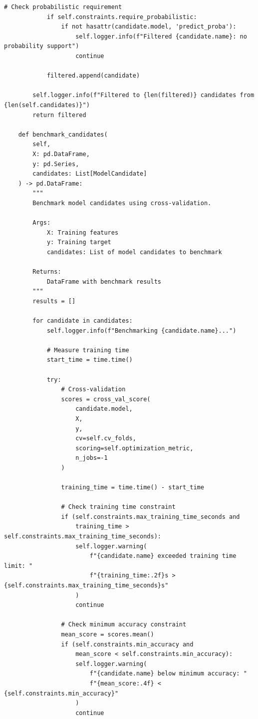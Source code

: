 \begin{lstlisting}[style=python, caption={Automated Model Selection Framework}]
            # Check probabilistic requirement
            if self.constraints.require_probabilistic:
                if not hasattr(candidate.model, 'predict_proba'):
                    self.logger.info(f"Filtered {candidate.name}: no probability support")
                    continue

            filtered.append(candidate)

        self.logger.info(f"Filtered to {len(filtered)} candidates from {len(self.candidates)}")
        return filtered

    def benchmark_candidates(
        self,
        X: pd.DataFrame,
        y: pd.Series,
        candidates: List[ModelCandidate]
    ) -> pd.DataFrame:
        """
        Benchmark model candidates using cross-validation.

        Args:
            X: Training features
            y: Training target
            candidates: List of model candidates to benchmark

        Returns:
            DataFrame with benchmark results
        """
        results = []

        for candidate in candidates:
            self.logger.info(f"Benchmarking {candidate.name}...")

            # Measure training time
            start_time = time.time()

            try:
                # Cross-validation
                scores = cross_val_score(
                    candidate.model,
                    X,
                    y,
                    cv=self.cv_folds,
                    scoring=self.optimization_metric,
                    n_jobs=-1
                )

                training_time = time.time() - start_time

                # Check training time constraint
                if (self.constraints.max_training_time_seconds and
                    training_time > self.constraints.max_training_time_seconds):
                    self.logger.warning(
                        f"{candidate.name} exceeded training time limit: "
                        f"{training_time:.2f}s > {self.constraints.max_training_time_seconds}s"
                    )
                    continue

                # Check minimum accuracy constraint
                mean_score = scores.mean()
                if (self.constraints.min_accuracy and
                    mean_score < self.constraints.min_accuracy):
                    self.logger.warning(
                        f"{candidate.name} below minimum accuracy: "
                        f"{mean_score:.4f} < {self.constraints.min_accuracy}"
                    )
                    continue


\end{lstlisting}
